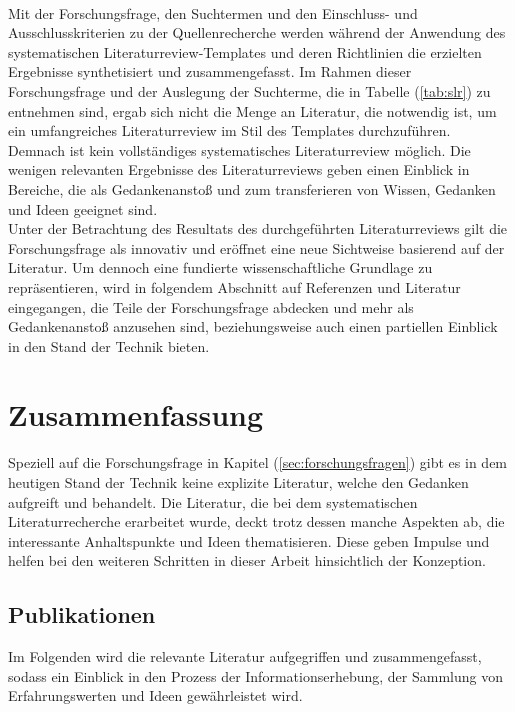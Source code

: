         \\
        Mit der Forschungsfrage, den Suchtermen und den Einschluss- und Ausschlusskriterien zu der Quellenrecherche werden während der Anwendung
        des systematischen Literaturreview-Templates und deren Richtlinien die erzielten Ergebnisse synthetisiert und zusammengefasst. Im Rahmen 
        dieser Forschungsfrage und der Auslegung der Suchterme, die in Tabelle (\ref{tab:slr}) zu entnehmen sind, ergab sich nicht die Menge an Literatur, 
        die notwendig ist, um ein umfangreiches Literaturreview im Stil des Templates durchzuführen. Demnach ist kein vollständiges systematisches Literaturreview 
        möglich. Die wenigen relevanten Ergebnisse des Literaturreviews geben einen Einblick in Bereiche, die als Gedankenanstoß und zum transferieren von 
        Wissen, Gedanken und Ideen geeignet sind. 
        \\
        \linebreak
        Unter der Betrachtung des Resultats des durchgeführten Literaturreviews gilt die Forschungsfrage als innovativ und eröffnet eine 
        neue Sichtweise basierend auf der Literatur. Um dennoch eine fundierte wissenschaftliche Grundlage zu repräsentieren, wird in 
        folgendem Abschnitt auf Referenzen und Literatur eingegangen, die Teile der Forschungsfrage abdecken und mehr als Gedankenanstoß 
        anzusehen sind, beziehungsweise auch einen partiellen Einblick in den Stand der Technik bieten. 

\section{Zusammenfassung} 
    Speziell auf die Forschungsfrage in Kapitel (\ref{sec:forschungsfragen}) gibt es in dem heutigen Stand der Technik keine explizite 
    Literatur, welche den Gedanken aufgreift und behandelt. Die Literatur, die bei dem systematischen Literaturrecherche erarbeitet wurde, 
    deckt trotz dessen manche Aspekten ab, die interessante Anhaltspunkte und Ideen thematisieren. Diese geben Impulse und helfen bei den weiteren 
    Schritten in dieser Arbeit hinsichtlich der Konzeption. 
    
    \subsection{Publikationen}
    \label{subsec:publications}
        Im Folgenden wird die relevante Literatur aufgegriffen und zusammengefasst, sodass ein Einblick in den Prozess der 
        Informationserhebung, der Sammlung von Erfahrungswerten und Ideen gewährleistet wird.
        

